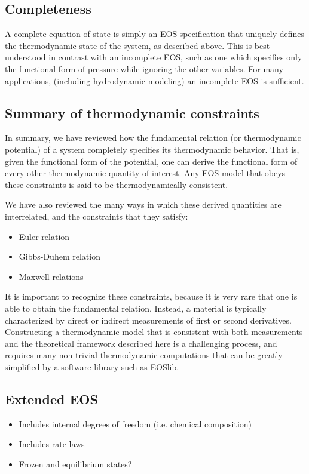 \documentclass[twocolumn,10pt]{asme2ej}
\begin{document}
\subsection{Completeness}
A complete equation of state is simply an EOS specification that uniquely defines the thermodynamic state of the system, as described above. This is best understood in contrast with an incomplete EOS, such as one which specifies only the functional form of pressure while ignoring the other variables. For many applications, (including hydrodynamic modeling) an incomplete EOS is sufficient.

\subsection{Summary of thermodynamic constraints}
In summary, we have reviewed how the fundamental relation (or thermodynamic potential) of a system completely specifies its thermodynamic behavior. That is, given the functional form of the potential, one can derive the functional form of every other thermodynamic quantity of interest. Any EOS model that obeys these constraints is said to be thermodynamically consistent. 

We have also reviewed the many ways in which these derived quantities are interrelated, and the constraints that they satisfy:
\begin{itemize}
	\item Euler relation
	\item Gibbs-Duhem relation
	\item Maxwell relations
\end{itemize}
It is important to recognize these constraints, because it is very rare that one is able to obtain the fundamental relation. Instead, a material is typically characterized by direct or indirect measurements of first or second derivatives. Constructing a thermodynamic model that is consistent with both measurements and the theoretical framework described here is a challenging process, and requires many non-trivial thermodynamic computations that can be greatly simplified by a software library such as EOSlib. 

\subsection{Extended EOS}
\begin{itemize}
	\item Includes internal degrees of freedom (i.e. chemical composition)
	\item Includes rate laws
	\item Frozen and equilibrium states?
\end{itemize}
\end{document}

